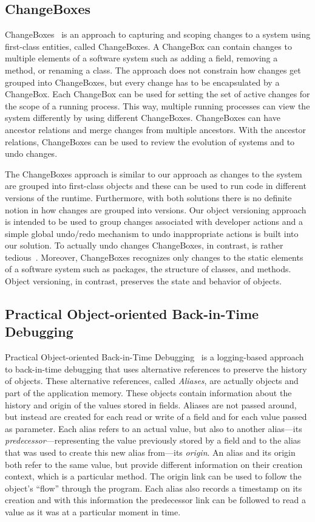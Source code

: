 \subsection{ChangeBoxes}

ChangeBoxes~\cite{Denker2007EEC} is an approach to capturing and scoping changes to a system using first-class entities, called ChangeBoxes.
A ChangeBox can contain changes to multiple elements of a software system such as adding a field, removing a method, or renaming a class.
The approach does not constrain how changes get grouped into ChangeBoxes, but every change has to be encapsulated by a ChangeBox.
Each ChangeBox can be used for setting the set of active changes for the scope of a running process.
This way, multiple running processes can view the system differently by using different ChangeBoxes.
ChangeBoxes can have ancestor relations and merge changes from multiple ancestors.
With the ancestor relations, ChangeBoxes can be used to review the evolution of systems and to undo changes.

The ChangeBoxes approach is similar to our approach as changes to the system are grouped into first-class objects and these can be used to run code in different versions of the runtime.
Furthermore, with both solutions there is no definite notion in how changes are grouped into versions.
Our object versioning approach is intended to be used to group changes associated with developer actions and a simple global undo/redo mechanism to undo inappropriate actions is built into our solution.
To actually undo changes ChangeBoxes, in contrast, is rather tedious~\cite{Steinert2012COE}.
Moreover, ChangeBoxes recognizes only changes to the static elements of a software system such as packages, the structure of classes, and methods.
Object versioning, in contrast, preserves the state and behavior of objects.


\subsection{Practical Object-oriented Back-in-Time Debugging}

Practical Object-oriented Back-in-Time Debugging~\cite{Lienhard2008POB,Lienhard2008PhD} is a logging-based approach to back-in-time debugging that uses alternative references to preserve the history of objects.
These alternative references, called \emph{Aliases}, are actually objects and part of the application memory.
These objects contain information about the history and origin of the values stored in fields.
Aliases are not passed around, but instead are created for each read or write of a field and for each value passed as parameter.
Each alias refers to an actual value, but also to another alias---its \emph{predecessor}---representing the value previously stored by a field and to the alias that was used to create this new alias from---its \emph{origin}.
An alias and its origin both refer to the same value, but provide different information on their creation context, which is a particular method.
The origin link can be used to follow the object's ``flow'' through the program.
Each alias also records a timestamp on its creation and with this information the predecessor link can be followed to read a value as it was at a particular moment in time.

